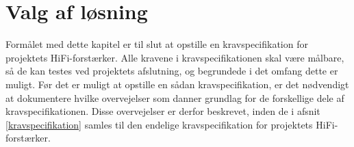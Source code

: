 \chapter{Valg af løsning}
\label{valgafloesning}
Formålet med dette kapitel er til slut at opstille en kravspecifikation for projektets HiFi-forstærker. Alle kravene i kravspecifikationen skal være målbare, så de kan testes ved projektets afslutning, og begrundede i det omfang dette er muligt. Før det er muligt at opstille en sådan kravspecifikation, er det nødvendigt at dokumentere hvilke overvejelser som danner grundlag for de forskellige dele af kravspecifikationen. Disse overvejelser er derfor beskrevet, inden de i afsnit \ref{kravspecifikation} samles til den endelige kravspecifikation for projektets HiFi-forstærker. 
